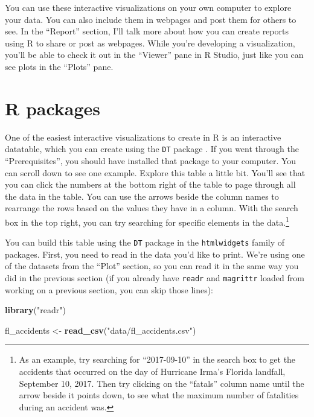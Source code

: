 \documentclass[]{tufte-book}
\newenvironment{Shaded}{}{}
\newcommand{\KeywordTok}[1]{\textcolor[rgb]{0.00,0.44,0.13}{\textbf{#1}}}
\newcommand{\NormalTok}[1]{#1}
\newcommand{\StringTok}[1]{\textcolor[rgb]{0.25,0.44,0.63}{#1}}
\begin{document}
You can use these interactive visualizations on your own computer to explore your
data. You can also include them in webpages and post them for others to see. In the
``Report'' section, I'll talk more about how you can create reports using R to share or post as
webpages. While you're developing a visualization, you'll be able to check it out in
the ``Viewer'' pane in R Studio, just like you can see plots in the ``Plots'' pane.

\hypertarget{r-packages}{%
\section{R packages}\label{r-packages}}

One of the easiest interactive visualizations to create in R is an interactive datatable,
which you can create using the \texttt{DT} package \citep{R-DT}.
If you went through the ``Prerequisites'', you should have installed that package to your
computer.
You can scroll down to see one example. Explore this table a little bit. You'll
see that you can click the numbers at the bottom right of the table to page through all
the data in the table. You can use the arrows beside the column names to rearrange
the rows based on the values they have in a column. With the search box in the top right,
you can try searching for specific elements in the data.\footnote{As an example, try searching for
  ``2017-09-10'' in the search box to get the accidents that occurred on the day of Hurricane
  Irma's Florida landfall, September 10, 2017. Then try clicking on the ``fatals'' column
  name until the arrow beside it points down, to see what the maximum number of fatalities
  during an accident was.}

You can build this table using the \texttt{DT} package in the \texttt{htmlwidgets} family of packages.
First, you need to read in the data you'd like to print. We're using one of the datasets
from the ``Plot'' section, so you can read it in the same way you did in the previous section
(if you already have \texttt{readr} and \texttt{magrittr} loaded from working on a previous section,
you can skip those lines):

\begin{Shaded}
\begin{Highlighting}[]
\KeywordTok{library}\NormalTok{(}\StringTok{"readr"}\NormalTok{)}

\NormalTok{fl_accidents <-}\StringTok{ }\KeywordTok{read_csv}\NormalTok{(}\StringTok{"data/fl_accidents.csv"}\NormalTok{)}
\end{Highlighting}
\end{Shaded}
\end{document}
